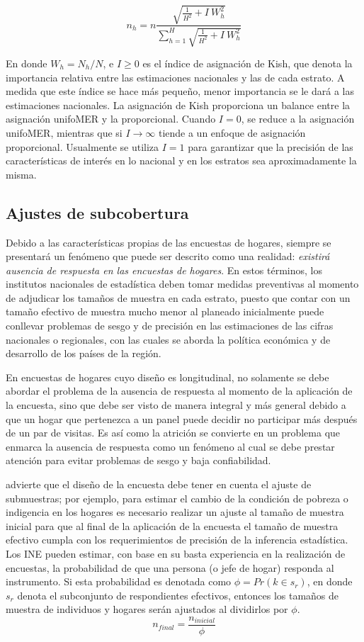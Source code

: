 \documentclass[
  12pt,
  spanish,
]{book}
\begin{document}
\[
n_h=n\frac{\sqrt{\frac{1}{H^2}+I\ W_h^2}}{\sum_{h=1}^{H}\sqrt{\frac{1}{H^2}+I\ W_h^2}}
\]

En donde \(W_h=N_h/N\), e \(I \geq 0\) es el índice de asignación de Kish, que denota la importancia relativa entre las estimaciones nacionales y las de cada estrato. A medida que este índice se hace más pequeño, menor importancia se le dará a las estimaciones nacionales. La asignación de Kish proporciona un balance entre la asignación unifoMER y la proporcional. Cuando \(I=0\), se reduce a la asignación unifoMER, mientras que si \(I \rightarrow \infty\) tiende a un enfoque de asignación proporcional. Usualmente se utiliza \(I = 1\) para garantizar que la precisión de las características de interés en lo nacional y en los estratos sea aproximadamente la misma.

\hypertarget{ajustes-de-subcobertura}{%
\subsection{Ajustes de subcobertura}\label{ajustes-de-subcobertura}}

Debido a las características propias de las encuestas de hogares, siempre se presentará un fenómeno que puede ser descrito como una realidad: \emph{existirá ausencia de respuesta en las encuestas de hogares}. En estos términos, los institutos nacionales de estadística deben tomar medidas preventivas al momento de adjudicar los tamaños de muestra en cada estrato, puesto que contar con un tamaño efectivo de muestra mucho menor al planeado inicialmente puede conllevar problemas de sesgo y de precisión en las estimaciones de las cifras nacionales o regionales, con las cuales se aborda la política económica y de desarrollo de los países de la región.

En encuestas de hogares cuyo diseño es longitudinal, no solamente se debe abordar el problema de la ausencia de respuesta al momento de la aplicación de la encuesta, sino que debe ser visto de manera integral y más general debido a que un hogar que pertenezca a un panel puede decidir no participar más después de un par de visitas. Es así como la atrición se convierte en un problema que enmarca la ausencia de respuesta como un fenómeno al cual se debe prestar atención para evitar problemas de sesgo y baja confiabilidad.

\citet{Kalton_2009} advierte que el diseño de la encuesta debe tener en cuenta el ajuste de submuestras; por ejemplo, para estimar el cambio de la condición de pobreza o indigencia en los hogares es necesario realizar un ajuste al tamaño de muestra inicial para que al final de la aplicación de la encuesta el tamaño de muestra efectivo cumpla con los requerimientos de precisión de la inferencia estadística. Los INE pueden estimar, con base en su basta experiencia en la realización de encuestas, la probabilidad de que una persona (o jefe de hogar) responda al instrumento. Si esta probabilidad es denotada como \(\phi=Pr(k \in s_r)\), en donde \(s_r\) denota el subconjunto de respondientes efectivos, entonces los tamaños de muestra de individuos y hogares serán ajustados al dividirlos por \(\phi\).
\[n_{final} = \frac{n_{inicial}}{\phi}\]
\end{document}
